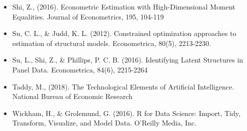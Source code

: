 \documentclass[11pt]{article}
\begin{document}
\begin{itemize}
\item Shi, Z., (2016). Econometric Estimation with High-Dimensional Moment Equalities. Journal of Econometrics, 195, 104-119 
\item Su, C. L., \& Judd, K. L. (2012). Constrained optimization approaches to estimation of structural models. Econometrica, 80(5), 2213-2230.
\item Su, L., Shi, Z., \& Phillips, P. C. B. (2016). Identifying Latent Structures in Panel Data. Econometrica, 84(6), 2215-2264
\item Taddy, M., (2018). The Technological Elements of Artificial Intelligence. National Bureau of Economic Research 
\item Wickham, H., \& Grolemund, G.  (2016). R for Data Science: Import, Tidy, Transform, Visualize, and Model Data. O’Reilly Media, Inc. 
\end{itemize}
\end{document}
